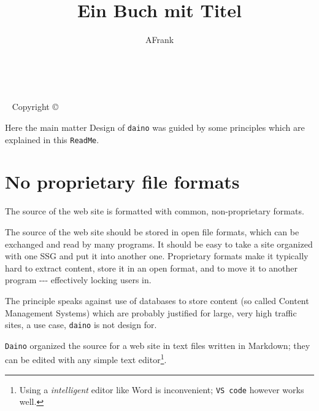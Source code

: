\documentclass{tufte-book}
\title{Ein Buch mit Titel}
\author[The Tufte-LaTeX Developers]{AFrank}
\newcommand{\openepigraph}[2]{%
  \begin{fullwidth}
  \sffamily\large
  \begin{doublespace}
  \noindent\allcaps{#1}\\%
  \noindent\allcaps{#2}%
  \end{doublespace}
  \end{fullwidth}
}
\newcommand{\blankpage}{\newpage\hbox{}\thispagestyle{empty}\newpage}
\begin{document}
\frontmatter

\blankpage

\newpage\thispagestyle{empty}

\vfill
\openepigraph{%
Was soll man tun?
}{AF}
\vfill



\maketitle


\newpage
\begin{fullwidth}
~\vfill
\thispagestyle{empty}
\setlength{\parindent}{0pt}
\setlength{\parskip}{\baselineskip}
Copyright \copyright\ \the\year\ \thanklessauthor

\end{fullwidth}

\tableofcontents

\listoffigures

\listoftables






\mainmatter

Here the main matter
Design of \texttt{daino} was guided by some principles which are
explained in this \texttt{ReadMe}.


\chapter{No proprietary file formats}
\begin{mdframed}The source of the web site is formatted with common, non-proprietary formats.\end{mdframed}
The source of the web site should be stored in open file formats, which
can be exchanged and read by many programs. It should be easy to take a
site organized with one SSG and put it into another one. Proprietary
formats make it typically hard to extract content, store it in an open
format, and to move it to another program -\/-\/- effectively locking
users in.

The principle speaks against use of databases to store content (so
called Content Management Systems) which are probably justified for
large, very high traffic sites, a use case, \texttt{daino} is not design
for.

\texttt{Daino} organized the source for a web site in text files written
in Markdown; they can be edited with any simple text editor\footnote{Using
	a \emph{intelligent} editor like Word is inconvenient;
	\texttt{VS\ code} however works well.}.
\end{document}
